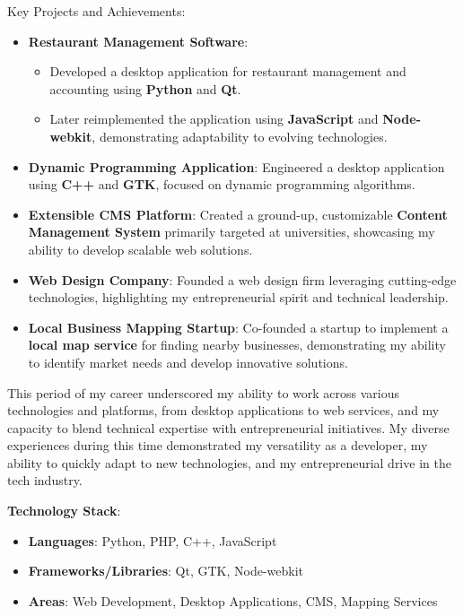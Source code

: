 Key Projects and Achievements:
\begin{itemize}
    \item \textbf{Restaurant Management Software}: 
        \begin{itemize}
            \item Developed a desktop application for restaurant management and accounting using \textbf{Python} and \textbf{Qt}.
            \item Later reimplemented the application using \textbf{JavaScript} and \textbf{Node-webkit}, demonstrating adaptability to evolving technologies.
        \end{itemize}
    
    \item \textbf{Dynamic Programming Application}: Engineered a desktop application using \textbf{C++} and \textbf{GTK}, focused on dynamic programming algorithms.
    
    \item \textbf{Extensible CMS Platform}: Created a ground-up, customizable \textbf{Content Management System} primarily targeted at universities, showcasing my ability to develop scalable web solutions.
    
    \item \textbf{Web Design Company}: Founded a web design firm leveraging cutting-edge technologies, highlighting my entrepreneurial spirit and technical leadership.
    
    \item \textbf{Local Business Mapping Startup}: Co-founded a startup to implement a \textbf{local map service} for finding nearby businesses, demonstrating my ability to identify market needs and develop innovative solutions.
\end{itemize}

This period of my career underscored my ability to work across various technologies and platforms, from desktop applications to web services, and my capacity to blend technical expertise with entrepreneurial initiatives. My diverse experiences during this time demonstrated my versatility as a developer, my ability to quickly adapt to new technologies, and my entrepreneurial drive in the tech industry.

\smallskip
\textbf{Technology Stack}:
\begin{itemize}
    \item \textbf{Languages}: Python, PHP, C++, JavaScript
    \item \textbf{Frameworks/Libraries}: Qt, GTK, Node-webkit
    \item \textbf{Areas}: Web Development, Desktop Applications, CMS, Mapping Services
\end{itemize}
